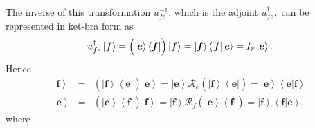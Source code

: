 \documentclass[aps,preprint]{revtex4}
\begin{document}
The inverse of this transformation $u_{fe}^{-1}$, which is the adjoint $%
u_{fe}^{\dagger },$ can be represented in ket-bra form as 
\begin{equation*}
u_{fe}^{\dagger }\left\vert \boldsymbol{f}\right\rangle =\left( \overset{}{%
\left\vert \boldsymbol{e}\right\rangle \left\langle \boldsymbol{f}%
\right\vert }\right) \left\vert \boldsymbol{f}\right\rangle =\left\vert 
\boldsymbol{f}\right\rangle \left\langle \left. \boldsymbol{f}\right\vert 
\boldsymbol{e}\right\rangle =I_{r}\left\vert \boldsymbol{e}\right\rangle .
\end{equation*}%
Hence 
\begin{eqnarray}
\left\vert \boldsymbol{f}\right\rangle &=&\left( \overset{}{\left\vert 
\boldsymbol{f}\right\rangle \left\langle \boldsymbol{e}\right\vert }\right)
\left\vert \boldsymbol{e}\right\rangle =\left\vert \boldsymbol{e}%
\right\rangle \mathcal{R}_{e}\left( \overset{}{\left\vert \boldsymbol{f}%
\right\rangle \left\langle \boldsymbol{e}\right\vert }\right) =\left\vert 
\boldsymbol{e}\right\rangle \left\langle \left. \boldsymbol{e}\right\vert 
\boldsymbol{f}\right\rangle \\
\left\vert \boldsymbol{e}\right\rangle &=&\left( \overset{}{\left\vert 
\boldsymbol{e}\right\rangle \left\langle \boldsymbol{f}\right\vert }\right)
\left\vert \boldsymbol{f}\right\rangle =\left\vert \boldsymbol{f}%
\right\rangle \mathcal{R}_{f}\left( \overset{}{\left\vert \boldsymbol{e}%
\right\rangle \left\langle \boldsymbol{f}\right\vert }\right) =\left\vert 
\boldsymbol{f}\right\rangle \left\langle \left. \boldsymbol{f}\right\vert 
\boldsymbol{e}\right\rangle ,
\end{eqnarray}%
where 
\end{document}
